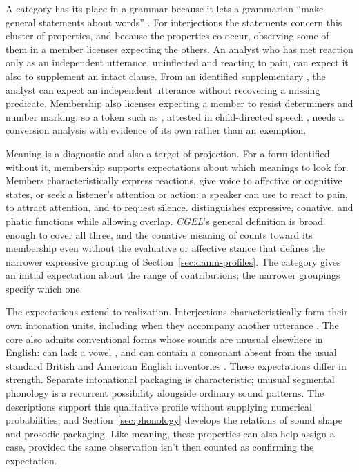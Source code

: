 \documentclass[12pt]{article}
\begin{document}
A category has its place in a grammar because it lets a grammarian
\enquote{make general statements about words} \citep[30]{HuddlestonPullum2002}.
For interjections the statements concern this cluster of properties, and
because the properties co-occur, observing some of them in a member
licenses expecting the others. An analyst who has met reaction
 only as an independent utterance, uninflected and reacting
to pain, can expect it also to supplement an intact clause. From an
identified supplementary , the analyst can expect an
independent utterance without recovering a missing predicate. Membership
also licenses expecting a member to resist determiners and number marking,
so a token such as , attested in child-directed
speech \citep[36]{stange2016}, needs a conversion analysis with evidence of
its own rather than an exemption.

Meaning is a diagnostic and also a target of projection. For a form
identified without it, membership supports expectations about which
meanings to look for. Members characteristically express reactions, give
voice to affective or cognitive states, or seek a listener's attention or
action: a speaker can use  to react to pain, 
to attract attention, and  to request silence.
\textcite[113--115]{ameka1992} distinguishes expressive, conative, and
phatic functions while allowing overlap. \textit{CGEL}'s general definition
is broad enough to cover all three, and the conative meaning of 
counts toward its membership even without the evaluative or affective stance
that defines the narrower
expressive grouping of Section~\ref{sec:damn-profiles}. The category gives
an initial expectation about the range of contributions; the narrower
groupings specify which one.

The expectations extend to realization. Interjections characteristically
form their own intonation units, including when they accompany another
utterance \citep[108]{ameka1992}. The core also admits conventional forms
whose sounds are unusual elsewhere in English:  can lack a
vowel \citep[105--106]{ameka1992}, and  can contain a
consonant absent from the usual standard British and American English
inventories \citep[74, 853]{quirk1985}. These expectations differ in
strength. Separate intonational packaging is characteristic; unusual
segmental phonology is a recurrent possibility alongside ordinary sound
patterns. The descriptions support this qualitative profile without
supplying numerical probabilities, and Section~\ref{sec:phonology} develops
the relations of sound shape and prosodic packaging. Like meaning, these
properties can also help assign a case, provided the same observation isn't
then counted as confirming the expectation.
\end{document}
